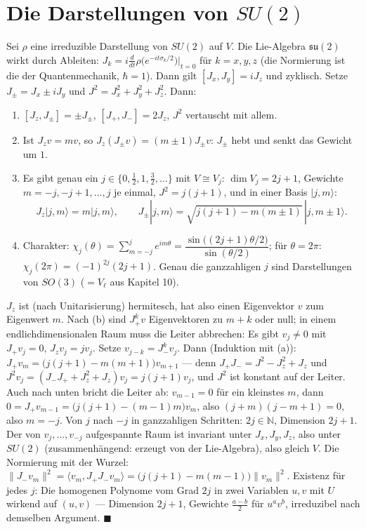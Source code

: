 \section{Die Darstellungen von $SU(2)$}

\begin{merksatz}
Sei $\rho$ eine irreduzible Darstellung von $SU(2)$ auf $V$. Die Lie-Algebra $\mathfrak{su}(2)$ wirkt durch Ableiten: $J_k = i\frac{d}{dt}\rho\bigl(e^{-it\sigma_k/2}\bigr)\big|_{t = 0}$ für $k = x, y, z$ (die Normierung ist die der Quantenmechanik, $\hbar = 1$). Dann gilt $[J_x, J_y] = iJ_z$ und zyklisch. Setze $J_\pm = J_x\pm iJ_y$ und $J^{2} = J_x^{2} + J_y^{2} + J_z^{2}$. Dann:
\begin{enumerate}[label=(\alph*), leftmargin=1.6em]
\item $[J_z, J_\pm] = \pm J_\pm$, $[J_+, J_-] = 2J_z$, $J^{2}$ vertauscht mit allem.
\item Ist $J_zv = mv$, so $J_z(J_\pm v) = (m\pm1)J_\pm v$: $J_\pm$ hebt und senkt das Gewicht um $1$.
\item Es gibt genau ein $j\in\{0, \frac12, 1, \frac32, \dots\}$ mit $V\cong V_j$: $\dim V_j = 2j + 1$, Gewichte $m = -j, -j + 1, \dots, j$ je einmal, $J^{2} = j(j + 1)$, und in einer Basis $|j, m\rangle$:
\[ J_z|j, m\rangle = m|j, m\rangle,\qquad J_\pm|j, m\rangle = \sqrt{j(j + 1) - m(m\pm1)}\,|j, m\pm1\rangle . \]
\item Charakter: $\chi_j(\theta) = \sum_{m = -j}^{j}e^{im\theta} = \dfrac{\sin\bigl((2j + 1)\theta/2\bigr)}{\sin(\theta/2)}$; für $\theta = 2\pi$: $\chi_j(2\pi) = (-1)^{2j}(2j + 1)$. Genau die ganzzahligen $j$ sind Darstellungen von $SO(3)$ ($= V_\ell$ aus Kapitel 10).
\end{enumerate}

$J_z$ ist (nach Unitarisierung) hermitesch, hat also einen Eigenvektor $v$ zum Eigenwert $m$. Nach (b) sind $J_+^{k}v$ Eigenvektoren zu $m + k$ oder null; in einem endlichdimensionalen Raum muss die Leiter abbrechen: Es gibt $v_j\neq0$ mit $J_+v_j = 0$, $J_zv_j = jv_j$. Setze $v_{j-k} = J_-^{k}v_j$. Dann (Induktion mit (a)): $J_+v_{m} = \bigl(j(j + 1) - m(m + 1)\bigr)v_{m+1}$ --- denn $J_+J_- = J^{2} - J_z^{2} + J_z$ und $J^{2}v_j = (J_-J_+ + J_z^{2} + J_z)v_j = j(j + 1)v_j$, und $J^{2}$ ist konstant auf der Leiter. Auch nach unten bricht die Leiter ab: $v_{m-1} = 0$ für ein kleinstes $m$, dann $0 = J_+v_{m-1} = \bigl(j(j + 1) - (m - 1)m\bigr)v_m$, also $(j + m)(j - m + 1) = 0$, also $m = -j$. Von $j$ nach $-j$ in ganzzahligen Schritten: $2j\in\mathbb N$, Dimension $2j + 1$. Der von $v_j, \dots, v_{-j}$ aufgespannte Raum ist invariant unter $J_x, J_y, J_z$, also unter $SU(2)$ (zusammenhängend: erzeugt von der Lie-Algebra), also gleich $V$. Die Normierung mit der Wurzel: $\|J_-v_m\|^{2} = \langle v_m, J_+J_-v_m\rangle = \bigl(j(j + 1) - m(m - 1)\bigr)\|v_m\|^{2}$. Existenz für jedes $j$: Die homogenen Polynome vom Grad $2j$ in zwei Variablen $u, v$ mit $U$ wirkend auf $(u, v)$ --- Dimension $2j + 1$, Gewichte $\frac{a - b}2$ für $u^{a}v^{b}$, irreduzibel nach demselben Argument. $\blacksquare$


\end{merksatz}

